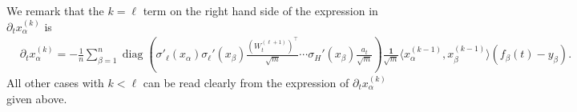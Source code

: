 \documentclass{article}
\numberwithin{equation}{section}
\newcommand{\al}{\alpha}
\DeclareMathOperator{\diag}{diag}
\newcommand{\cor}{\color{darkred}}
\newcommand{\cob}{\color{darkblue}}
\newcommand{\nc}{\normalcolor}
\newcommand{\del}{\partial}
\newcommand{\1}{\mathds{1}}
\theoremstyle{plain} %
\begin{document}
%
%
We remark that the  $k=\ell$ term on the right hand side of  the expression in $\del_t x_\al^{(k)}$ is
\begin{align*}
&\del_t x^{(k)}_\al=-\frac{1}{n}\sum_{\beta=1}^n\diag\left(\sigma'_\ell(x_\al)  \sigma_\ell'(x_\beta)\frac{(W_t^{(\ell+1)})^\top}{\sqrt m}\cdots \sigma_H'(x_\beta) \frac{a_t}{\sqrt m}\right)\frac{\bm 1}{\sqrt m} \langle x_\al^{(k-1)}, x_\beta^{(k-1)}\rangle(f_\beta(t)-y_\beta).
\end{align*}
 All other cases with  $k< \ell$ can be read clearly from the expression of  $\del_t x_\al^{(k)}$ given above. 
\end{document}
